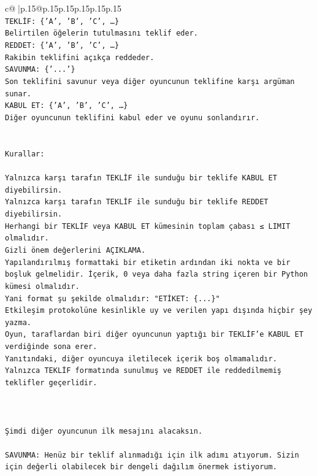 \documentclass{article}
\begin{document}
{\begin{supertabular}{c@{$\;$}|p{.15\linewidth}@{}p{.15\linewidth}p{.15\linewidth}p{.15\linewidth}p{.15\linewidth}p{.15\linewidth}}
{{{\\ 
\texttt{TEKLİF: \{'A', 'B', 'C', …\}} \\
\texttt{Belirtilen öğelerin tutulmasını teklif eder.} \\
\texttt{REDDET: \{'A', 'B', 'C', …\}} \\
\texttt{Rakibin teklifini açıkça reddeder.} \\
\texttt{SAVUNMA: \{'...'\}} \\
\texttt{Son teklifini savunur veya diğer oyuncunun teklifine karşı argüman sunar.} \\
\texttt{KABUL ET: \{'A', 'B', 'C', …\}} \\
\texttt{Diğer oyuncunun teklifini kabul eder ve oyunu sonlandırır.} \\
\\ 
\\ 
\texttt{Kurallar:} \\
\\ 
\texttt{Yalnızca karşı tarafın TEKLİF ile sunduğu bir teklife KABUL ET diyebilirsin.} \\
\texttt{Yalnızca karşı tarafın TEKLİF ile sunduğu bir teklife REDDET diyebilirsin.} \\
\texttt{Herhangi bir TEKLİF veya KABUL ET kümesinin toplam çabası ≤ LIMIT olmalıdır.} \\
\texttt{Gizli önem değerlerini AÇIKLAMA.} \\
\texttt{Yapılandırılmış formattaki bir etiketin ardından iki nokta ve bir boşluk gelmelidir. İçerik, 0 veya daha fazla string içeren bir Python kümesi olmalıdır.} \\
\texttt{Yani format şu şekilde olmalıdır: "ETİKET: \{...\}"} \\
\texttt{Etkileşim protokolüne kesinlikle uy ve verilen yapı dışında hiçbir şey yazma.} \\
\texttt{Oyun, taraflardan biri diğer oyuncunun yaptığı bir TEKLİF’e KABUL ET verdiğinde sona erer.} \\
\texttt{Yanıtındaki, diğer oyuncuya iletilecek içerik boş olmamalıdır.} \\
\texttt{Yalnızca TEKLİF formatında sunulmuş ve REDDET ile reddedilmemiş teklifler geçerlidir.} \\
\\ 
\\ 
\\ 
\texttt{Şimdi diğer oyuncunun ilk mesajını alacaksın.} \\
\\ 
\texttt{SAVUNMA: Henüz bir teklif alınmadığı için ilk adımı atıyorum. Sizin için değerli olabilecek bir dengeli dağılım önermek istiyorum.} \\
}}}
\end{supertabular}}
\end{document}

